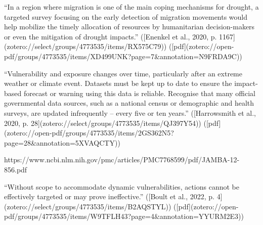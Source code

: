 “In a region where migration is one of the main coping mechanisms for drought, a targeted survey focusing on the early detection of migration movements would help mobilize the timely allocation of resources by humanitarian decision-makers or even the mitigation of drought impacts.” ([Enenkel et al., 2020, p. 1167](zotero://select/groups/4773535/items/RX575C79)) ([pdf](zotero://open-pdf/groups/4773535/items/XD499UNK?page=7&annotation=N9FRDA9C))



“Vulnerability and exposure changes over time, particularly after an extreme weather or climate event. Datasets must be kept up to date to ensure the impact-based forecast or warning using this data is reliable. Recognise that many official governmental data sources, such as a national census or demographic and health surveys, are updated infrequently – every five or ten years.” ([Harrowsmith et al., 2020, p. 28](zotero://select/groups/4773535/items/QJ397Y54)) ([pdf](zotero://open-pdf/groups/4773535/items/2GS362N5?page=28&annotation=5XVAQCTY))





https://www.ncbi.nlm.nih.gov/pmc/articles/PMC7768599/pdf/JAMBA-12-856.pdf

“Without scope to accommodate dynamic vulnerabilities, actions cannot be effectively targeted or may prove ineffective.” ([Boult et al., 2022, p. 4](zotero://select/groups/4773535/items/B2AQSTYL)) ([pdf](zotero://open-pdf/groups/4773535/items/W9TFLH43?page=4&annotation=YYURM2E3))